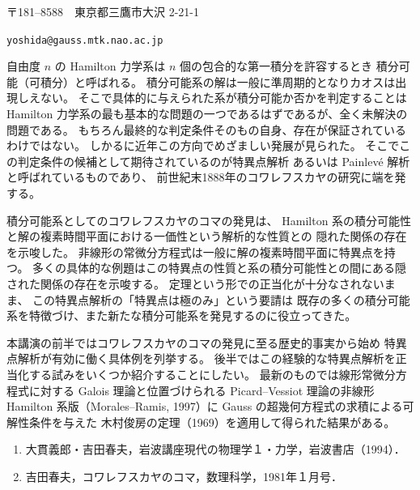 \documentclass[uplatex,dvipdfmx]{jlreq}
\begin{document}
\medskip
\hspace*{\fill}〒181--8588　東京都三鷹市大沢 2-21-1

\medskip
\hspace*{\fill}\texttt{yoshida@gauss.mtk.nao.ac.jp}

\bigskip\bigskip

自由度 $n$ の Hamilton 力学系は $n$ 個の包合的な第一積分を許容するとき
積分可能（可積分）と呼ばれる。
積分可能系の解は一般に準周期的となりカオスは出現しえない。
そこで具体的に与えられた系が積分可能か否かを判定することは
Hamilton 力学系の最も基本的な問題の一つであるはずであるが、全く未解決の問題である。
もちろん最終的な判定条件そのもの自身、存在が保証されているわけではない。
しかるに近年この方向でめざましい発展が見られた。
そこでこの判定条件の候補として期待されているのが特異点解析
あるいは Painlevé 解析と呼ばれているものであり、
前世紀末1888年のコワレフスカヤの研究に端を発する。

積分可能系としてのコワレフスカヤのコマの発見は、
Hamilton 系の積分可能性と解の複素時間平面における一価性という解析的な性質との
隠れた関係の存在を示唆した。
非線形の常微分方程式は一般に解の複素時間平面に特異点を持つ。
多くの具体的な例題はこの特異点の性質と系の積分可能性との間にある隠された関係の存在を示唆する。
定理という形での正当化が十分なされないまま、
この特異点解析の「特異点は極のみ」という要請は
既存の多くの積分可能系を特徴づけ、また新たな積分可能系を発見するのに役立ってきた。

本講演の前半ではコワレフスカヤのコマの発見に至る歴史的事実から始め
特異点解析が有効に働く具体例を列挙する。
後半ではこの経験的な特異点解析を正当化する試みをいくつか紹介することにしたい。
最新のものでは線形常微分方程式に対する Galois 理論と位置づけられる
Picard--Vessiot 理論の非線形 Hamilton 系版（Morales--Ramis, 1997）に
Gauss の超幾何方程式の求積による可解性条件を与えた
木村俊房の定理（1969）を適用して得られた結果がある。

\bigskip


\begin{enumerate}
  \setlength{\itemsep}{2pt}
  \item 大貫義郎・吉田春夫，岩波講座現代の物理学１・力学，岩波書店（1994）．
  \item 吉田春夫，コワレフスカヤのコマ，数理科学，1981年１月号．
\end{enumerate}
\end{document}
